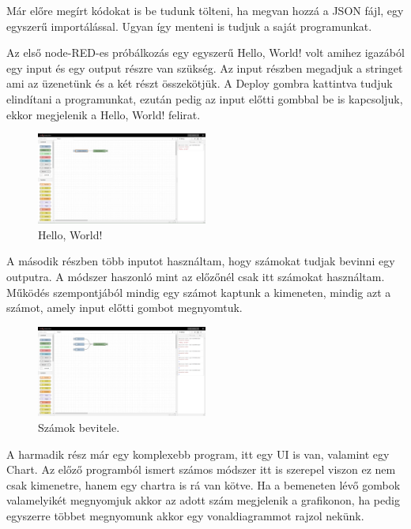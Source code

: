 \documentclass[a4paper,12pt,oneside]{report}
\begin{document}
Már előre megírt kódokat is be tudunk tölteni, ha megvan hozzá a JSON fájl, egy egyszerű importálással. Ugyan így menteni is tudjuk
a saját programunkat.

Az első node-RED-es próbálkozás egy egyszerű Hello, World! volt amihez igazából egy input és egy output részre van szükség.
Az input részben megadjuk a stringet ami az üzenetünk és a két részt összekötjük. A Deploy gombra kattintva tudjuk elindítani a
programunkat, ezután pedig az input előtti gombbal be is kapcsoljuk, ekkor megjelenik a Hello, World! felirat.

\begin{figure}[htbp]
	\centering
	\includegraphics[width=0.5\textwidth]{fig/Hello, World.png}
	\caption{Hello, World!}
	\label{fig-Hello, World}
\end{figure}

A második részben több inputot használtam, hogy számokat tudjak bevinni egy outputra. A módszer haszonló mint az előzőnél
csak itt számokat használtam. Működés szempontjából mindig egy számot kaptunk a kimeneten, mindig azt a számot, amely input előtti
gombot megnyomtuk.

\begin{figure}[htbp]
	\centering
	\includegraphics[width=0.5\textwidth]{fig/Numbers.png}
	\caption{Számok bevitele.}
	\label{fig-Numbers}
\end{figure}

A harmadik rész már egy komplexebb program, itt egy UI is van, valamint egy Chart. Az előző programból ismert számos módszer
itt is szerepel viszon ez nem csak kimenetre, hanem egy chartra is rá van kötve. Ha a bemeneten lévő gombok valamelyikét megnyomjuk 
akkor az adott szám megjelenik a grafikonon, ha pedig egyszerre többet megnyomunk akkor egy vonaldiagrammot rajzol nekünk.
\end{document}
